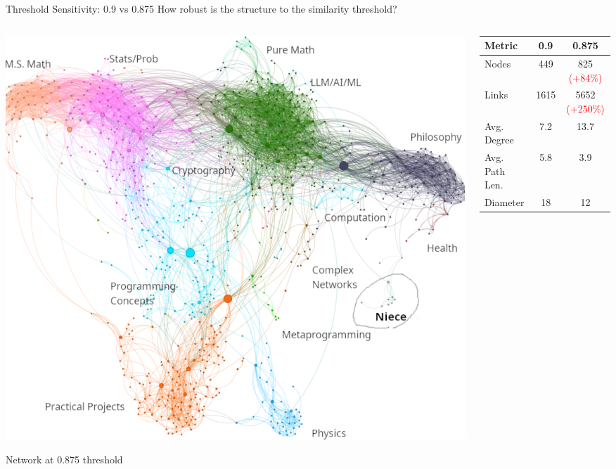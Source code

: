 \documentclass[nodes]{beamer}
\begin{document}
\begin{frame}{Threshold Sensitivity: 0.9 vs 0.875}
  How robust is the structure to the similarity threshold?
  \begin{columns}[T]
    \begin{column}{0.55\textwidth}
      \includegraphics[width=\linewidth]{images/0.875-wild-better.png}
      \begin{center}
        \scriptsize Network at 0.875 threshold
      \end{center}      
    \end{column}
    \begin{column}{0.45\textwidth}
      \scriptsize
      \begin{tabular}{lcc}
        \toprule
        \textbf{Metric}    & \textbf{0.9} & \textbf{0.875} \\
        \midrule
        Nodes              & 449          & 825 \textcolor{red}{(+84\%)} \\
        Links              & 1615         & 5652 \textcolor{red}{(+250\%)} \\
        Avg. Degree        & 7.2          & 13.7          \\
        Avg. Path Len.     & 5.8          & 3.9           \\
        Diameter           & 18           & 12            \\

\end{tabular}
\end{column}
\end{columns}
\end{frame}
\end{document}
